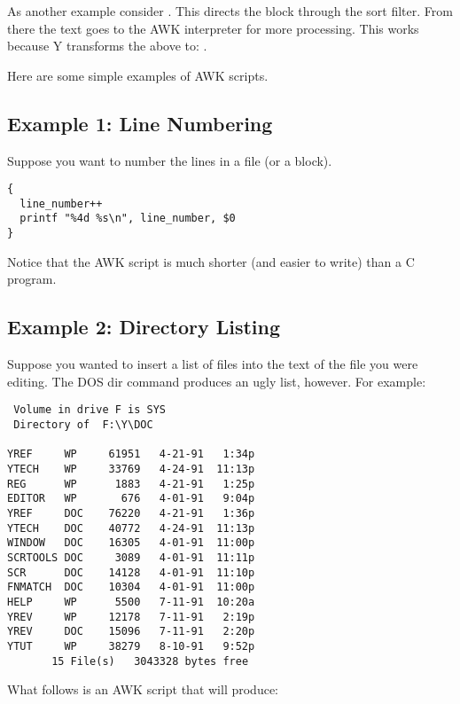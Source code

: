 As another example consider . This directs the block through
the sort filter. From there the text goes to the AWK interpreter for more processing. This works
because Y transforms the above to: .

Here are some simple examples of AWK scripts.

\subsection{Example 1: Line Numbering}

Suppose you want to number the lines in a file (or a block).

\begin{verbatim}
{
  line_number++
  printf "%4d %s\n", line_number, $0
}
\end{verbatim}

Notice that the AWK script is much shorter (and easier to write) than a C program.

\subsection{Example 2: Directory Listing}

Suppose you wanted to insert a list of files into the text of the file you were editing. The DOS
dir command produces an ugly list, however. For example:

\begin{verbatim}
 Volume in drive F is SYS        
 Directory of  F:\Y\DOC

YREF     WP     61951   4-21-91   1:34p
YTECH    WP     33769   4-24-91  11:13p
REG      WP      1883   4-21-91   1:25p
EDITOR   WP       676   4-01-91   9:04p
YREF     DOC    76220   4-21-91   1:36p
YTECH    DOC    40772   4-24-91  11:13p
WINDOW   DOC    16305   4-01-91  11:00p
SCRTOOLS DOC     3089   4-01-91  11:11p
SCR      DOC    14128   4-01-91  11:10p
FNMATCH  DOC    10304   4-01-91  11:00p
HELP     WP      5500   7-11-91  10:20a
YREV     WP     12178   7-11-91   2:19p
YREV     DOC    15096   7-11-91   2:20p
YTUT     WP     38279   8-10-91   9:52p
       15 File(s)   3043328 bytes free
\end{verbatim}

What follows is an AWK script that will produce:

